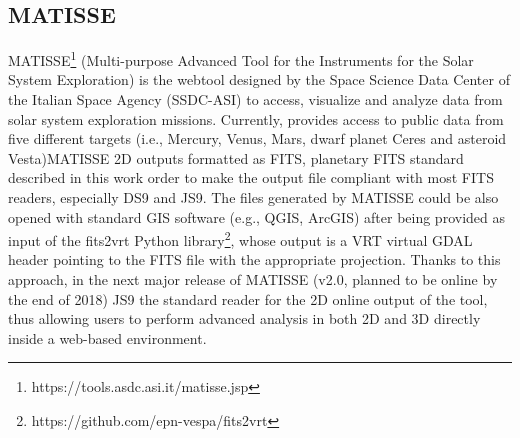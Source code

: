 \subsection{MATISSE}
MATISSE\footnote{https://tools.asdc.asi.it/matisse.jsp} (Multi-purpose Advanced Tool
for the Instruments for the Solar System Exploration) \citep{ZINZI2016} is the webtool
designed by the Space Science Data Center of the Italian Space Agency (SSDC-ASI) to
access, visualize and analyze data from solar system exploration missions.
Currently, \DIFdelbegin {}\DIFdelend \DIFaddbegin {}\DIFaddend provides access to public data from five different targets (i.e., Mercury,
Venus, Mars, \DIFaddbegin {}\DIFaddend dwarf planet Ceres and \DIFaddbegin {}\DIFaddend asteroid Vesta)\DIFdelbegin {}\DIFdelend \DIFaddbegin {}\DIFaddend MATISSE 2D outputs \DIFdelbegin {}\DIFdelend \DIFaddbegin {}\DIFaddend formatted as FITS, \DIFdelbegin {}\DIFdelend \DIFaddbegin {}\DIFaddend planetary FITS standard described in this work \DIFdelbegin {}\DIFdelend \DIFaddbegin {}\DIFaddend order to make the output
file compliant with most FITS readers, especially DS9 and JS9.
The files generated by MATISSE could be also opened with standard GIS software (e.g.,
QGIS, ArcGIS) 
after being provided as input of the fits2vrt Python library\footnote{https://github.com/epn-vespa/fits2vrt},
whose output is a VRT virtual GDAL header pointing to the FITS file with the appropriate
projection.
Thanks to this approach, in the next major release of MATISSE (v2.0, planned to be
online by the end of 2018) \DIFdelbegin {}\DIFdelend JS9 \DIFdelbegin {}\DIFdelend \DIFaddbegin {}\DIFaddend the standard reader for
the 2D online output of the tool, thus allowing users to perform advanced analysis in
both 2D and 3D directly inside a web-based environment.

